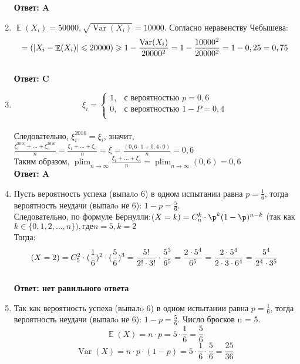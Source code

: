 \documentclass[112pt, cmcyralt]{article}
\DeclareMathOperator*\plim{plim}
\DeclareMathOperator{\Var}{Var}
\DeclareMathOperator{\E}{\mathbb{E}}
\let\P\relax
\DeclareMathOperator{\P}{\mathbb{P}}
\begin{document}
\begin{enumerate}
\textbf{Ответ: A}

\item $\E(X_i) = 50000, \sqrt{\Var(X_i)} = 10000$. Согласно неравенству Чебышева:\\
$$\P=(|X_i - \E(X_i)| \leqslant 20000) \geqslant 1 -  \frac{\Var(X_i)}{20000^2} = 1 - \frac{10000^2}{20000^2} = 1 - 0,25 = 0,75$$\\
\textbf{Ответ: C}

\item
\begin{equation*}
\xi_i = 
 \begin{cases}
   1, &\text{с вероятностью $p=0,6$}\\
   0, &\text{с вероятностью $1-P=0,4$}\\
 \end{cases}
\end{equation*}\\

Следовательно, $\xi_i^{2016} = \xi_i$, значит, $\frac{\xi_1^{2016} +…+ \xi_n^{2016}}{n} = \frac{\xi_1 +…+ \xi_n}{n} = \overline{\xi} = \frac{(0,6\cdot1 +0,4\cdot0)}{n}=0,6$\\
Таким образом, $\plim_{n\to\infty} \frac{\xi_1+\dots+\xi_n}{n}=\plim_{n\to\infty} (0,6) = 0,6$\\

\textbf{Ответ: A}

\item Пусть вероятность успеха (выпалo 6) в одном испытании равна $p = \frac{1}{6}$, тогда вероятность неудачи (выпалo не 6): $1 - p = \frac{5}{6}$.
\\Следовательно, по формуле Бернулли:$\P(X = k) = C_n^k\cdot \p^k (1-\p)^{n-k}$ (так как $k \in \{0, 1, 2,…, n\}), где n = 5, k = 2$\\
Тогда:\\
$$\P(X = 2) = C_5^2\cdot(\frac{1}{6})^2\cdot(\frac{5}{6})^3=\frac{5!}{2!\cdot3!}\cdot\frac{5^3}{6^5}=\frac{2\cdot5^4}{6^5}=\frac{2\cdot5^4}{2\cdot3\cdot6^4} =\frac{5^4}{2^4\cdot3^5}$$\\
\textbf{Ответ: нет равильного ответа}

\item Так как вероятность успеха (выпалo 6) в одном испытании равна $p = \frac{1}{6}$, тогда вероятность неудачи (выпалo не 6): $1 - p = \frac{5}{6}$. Число бросков n = 5.\\

$$\E(X) = n\cdot p = 5\cdot\frac{1}{6}=\frac{5}{6}$$
$$\Var(X) = n\cdot p\cdot(1-p) = 5\cdot\frac{1}{6} \cdot \frac{5}{6} = \frac{25}{36}$$\\


\end{enumerate}
\end{document}
